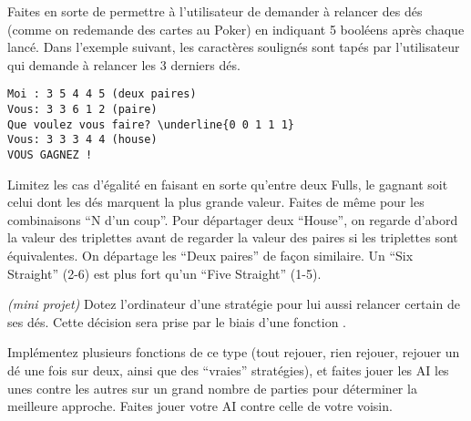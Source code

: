 \documentclass[10pt]{article}\usepackage[nu]{esial}
\begin{document}
\begin{Exercice}
  \noindent
  \begin{minipage}{.58\linewidth}
    \Question Faites en sorte de permettre à l'utilisateur de demander à
    relancer des dés (comme on redemande des cartes au Poker) en indiquant 5
    booléens après chaque lancé. Dans l'exemple suivant, les caractères
    soulignés sont tapés par l'utilisateur qui demande à relancer les 3 derniers
    dés.
  \end{minipage}\hfill\begin{minipage}{.4\linewidth}
    \begin{Verbatim}[numbers=none,commandchars=\\\{\}]
Moi : 3 5 4 4 5 (deux paires)
Vous: 3 3 6 1 2 (paire)
Que voulez vous faire? \underline{0 0 1 1 1}
Vous: 3 3 3 4 4 (house)
VOUS GAGNEZ !
    \end{Verbatim}
  \end{minipage}

  \Question Limitez les cas d'égalité en faisant en sorte qu'entre deux Fulls,
  le gagnant soit celui dont les dés marquent la plus grande valeur. Faites de
  même pour les combinaisons ``N d'un coup''. Pour départager deux ``House'',
  on regarde d'abord la valeur des triplettes avant de regarder la valeur des
  paires si les triplettes sont équivalentes. On départage les ``Deux paires''
  de façon similaire. Un ``Six Straight'' (2-6) est plus fort qu'un ``Five
  Straight'' (1-5).

  \Question \textit{(mini projet)} Dotez l'ordinateur d'une stratégie pour lui
  aussi relancer certain de ses dés. Cette décision sera prise par le biais
  d'une fonction . 

  \Question Implémentez plusieurs fonctions de ce type (tout rejouer, rien
  rejouer, rejouer un dé une fois sur deux, ainsi que des ``vraies''
  stratégies), et faites jouer les AI les unes contre les autres sur un grand
  nombre de parties pour déterminer la meilleure approche. Faites jouer votre
  AI contre celle de votre voisin.
\end{Exercice}
\end{document}
